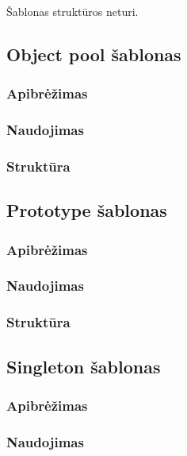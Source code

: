 \documentclass[10pt]{IEEEtran}
\begin{document}
				Šablonas struktūros neturi.

		\subsection{Object pool šablonas}

			

			\subsubsection{Apibrėžimas}

			\subsubsection{Naudojimas}

			\subsubsection{Struktūra}

		\subsection{Prototype šablonas}

			\subsubsection{Apibrėžimas}

			\subsubsection{Naudojimas}

			\subsubsection{Struktūra}

		\subsection{Singleton šablonas}

			\subsubsection{Apibrėžimas}

			\subsubsection{Naudojimas}
\end{document}
